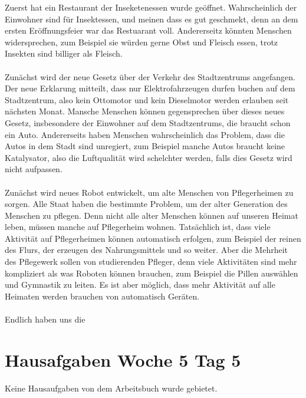 \documentclass{article}
\begin{document}
Zuerst hat ein Restaurant der Inseketenessen wurde geöffnet. Wahrscheinlich der Einwohner sind für Insektessen, und meinen dass es gut geschmekt, denn an dem ersten Eröffnungsfeier war das Restuarant voll. Andererseitz könnten Menschen widersprechen, zum Beispiel sie würden gerne Obst und Fleisch essen, trotz Insekten sind billiger als Fleisch.\\~\\
Zunächst wird der neue Gesetz über der Verkehr des Stadtzentrums angefangen. Der neue Erklarung mitteilt, dass nur Elektrofahrzeugen durfen buchen auf dem Stadtzentrum, also kein Ottomotor und kein Dieselmotor werden erlauben seit nächsten Monat. Mansche Menschen können gegensprechen über dieses neues Gesetz, insbesondere der Einwohner auf dem Stadtzentrums, die braucht schon ein Auto. Andererseits haben Menschen wahrscheinlich das Problem, dass die Autos in dem Stadt sind unregiert, zum Beispiel manche Autos braucht keine Katalysator, also die Luftqualität wird schelchter werden, falls dies Gesetz wird nicht aufpassen.\\~\\
Zunächst wird neues Robot entwickelt, um alte Menschen von Pflegerheimen zu sorgen. Alle Staat haben die bestimmte Problem, um der alter Generation des Menschen zu pflegen. Denn nicht alle alter Menschen können auf unseren Heimat leben, müssen manche auf Pflegerheim wohnen. Tatsächlich ist, dass viele Aktivität auf Pflegerheimen können automatisch erfolgen, zum Beispiel der reinen des Flurs, der erzeugen des Nahrungsmittels und so weiter. Aber die Mehrheit des Pflegewerk sollen von studierenden Pfleger, denn viele Aktivitäten sind mehr kompliziert als was Roboten können brauchen, zum Beispiel die Pillen auswählen und Gymnastik zu leiten. Es ist aber möglich, dass mehr Aktivität auf alle Heimaten werden brauchen von automatisch Geräten.\\~\\
Endlich haben uns die 
\section*{Hausafgaben Woche 5 Tag 5}
Keine Hausaufgaben von dem Arbeitsbuch wurde gebietet.
\end{document}
